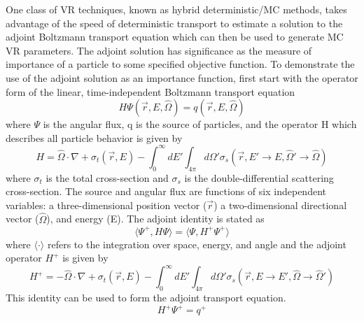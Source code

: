 One class of VR techniques, known as hybrid deterministic/MC methods,
takes advantage of the speed of deterministic transport to
estimate a solution to the adjoint Boltzmann transport equation 
which can then be used to generate MC VR parameters.
The adjoint solution has
significance as the measure of importance of a particle to some specified
objective function.  
To demonstrate the use of the adjoint solution as an importance function,
first start with the operator form of the linear, time-independent Boltzmann transport
equation \cite{l_m}
\begin{equation} \label{eq:3.1a}
	H\Psi(\overrightarrow{r}, E,\widehat{\Omega})  = q(\overrightarrow{r}, E,\widehat{\Omega})
\end{equation}
where $\Psi$ is the angular flux, q is the source of particles, and the operator H
which describes all particle behavior is given by
\begin{equation} \label{eq:3.1b}
		H = \widehat{\Omega} \cdot \nabla +
		    \sigma_{t}(\overrightarrow{r},E) - 
			\int_{0}^{\infty} dE'
			\int_{4\pi} d\Omega'
			\sigma_{s}( \overrightarrow{r}, E' 
			\rightarrow E, \widehat{\Omega}' 
			\rightarrow \widehat{\Omega} )
\end{equation}
where $\sigma_{t}$ is the total cross-section and $\sigma_{s}$ is the
double-differential scattering cross-section.  The source and angular flux are
functions of six independent variables: a three-dimensional position vector ($\overrightarrow{r}$) 
a two-dimensional directional vector ($\widehat{\Omega}$), and energy (E).
The adjoint identity is stated as
\begin{equation} \label{eq:3.2}
		\langle \Psi^{+} , H\Psi \rangle =
		\langle \Psi, H^{+}\Psi^{+} \rangle
\end{equation}
where $ \langle \cdot \rangle$ refers to the integration over space,
energy, and angle and the adjoint operator $H^{+}$ is given by
\begin{equation} \label{eq:3.2b}
		H^{+} = -\widehat{\Omega} \cdot \nabla +
		    \sigma_{t}(\overrightarrow{r},E) - 
			\int_{0}^{\infty} dE'
			\int_{4\pi} d\Omega'
			\sigma_{s}( \overrightarrow{r}, E 
			\rightarrow E', \widehat{\Omega} 
			\rightarrow \widehat{\Omega}' )
\end{equation}
This identity can be used to form the adjoint transport equation.
\begin{equation} \label{eq:3.3}
		H^{+}\Psi^{+} = q^{+}
\end{equation}

